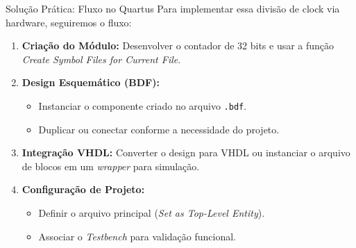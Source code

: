 \documentclass[aspectratio=169]{beamer}
\begin{document}
\begin{frame}{Solução Prática: Fluxo no Quartus }
	Para implementar essa divisão de clock via hardware, seguiremos o fluxo:
	
	\begin{enumerate}
		\item \textbf{Criação do Módulo:} Desenvolver o contador de 32 bits e usar a função \textit{Create Symbol Files for Current File}.
		\item \textbf{Design Esquemático (BDF):} 
		\begin{itemize}
			\item Instanciar o componente criado no arquivo \texttt{.bdf}.
			\item Duplicar ou conectar conforme a necessidade do projeto.
		\end{itemize}
		\item \textbf{Integração VHDL:} Converter o design para VHDL ou instanciar o arquivo de blocos em um \textit{wrapper} para simulação.
		\item \textbf{Configuração de Projeto:}
		\begin{itemize}
			\item Definir o arquivo principal (\textit{Set as Top-Level Entity}).
			\item Associar o \textit{Testbench} para validação funcional.
		\end{itemize}
	\end{enumerate}
\end{frame}



%	
%
\end{document}
